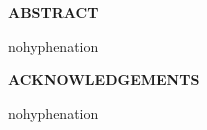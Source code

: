 \documentclass[oneside,11pt,letterpaper,openany]{report}
\begin{document}
\raggedbottom
\sloppy
{}
\pagestyle{empty}
\setlength{\parindent}{2 em}



\null\newpage

\begin{doublespace}
\centerline{\textbf{ABSTRACT}}

\end{doublespace}
\newpage

\vspace*{\fill}

\newpage

\pagestyle{plain}

\vspace*{\fill}
\begin{hyphenrules}{nohyphenation}
\begin{center}

\end{center}
\end{hyphenrules}
\vspace*{\fill}
\newpage

\begin{doublespace}
\centerline{
\textbf{ACKNOWLEDGEMENTS}
}

\end{doublespace}
\newpage


\begin{hyphenrules}{nohyphenation}
\setcounter{tocdepth}{0}
\tableofcontents %
\end{hyphenrules}
\end{document}
